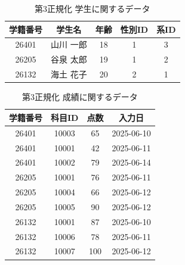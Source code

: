 \documentclass[a4paper,11pt]{ltjsarticle}
\begin{document}
\begin{table}[htbp] %
  \centering
  \caption{第3正規化 学生に関するデータ}
  \label{tab:normalized3_student}
  \begin{tabular}{|c|c|c|c|c|}
    \hline
    \textbf{学籍番号} & \textbf{学生名} & \textbf{年齢} & \textbf{性別ID} & \textbf{系ID} \\
    \hline

    26401         & 山川 一郎        & 18          & 1             & 3            \\
    \hline

    26205         & 谷泉 太郎        & 19          & 1             & 2            \\
    \hline

    26132         & 海土 花子        & 20          & 2             & 1            \\
    \hline
  \end{tabular}
\end{table}
\begin{table}[htbp] %
  \centering
  \caption{第3正規化 成績に関するデータ}
  \label{tab:normalized3_subject}
  \begin{tabular}{|c|c|c|c|}
    \hline
    \textbf{学籍番号} & \textbf{科目ID} & \textbf{点数} & \textbf{入力日} \\
    \hline

    26401         & 10003         & 65          & 2025-06-10   \\
    26401         & 10001         & 42          & 2025-06-11   \\
    26401         & 10002         & 79          & 2025-06-14   \\
    \hline

    26205         & 10001         & 76          & 2025-06-11   \\
    26205         & 10004         & 66          & 2025-06-12   \\
    26205         & 10005         & 90          & 2025-06-12   \\
    \hline

    26132         & 10001         & 87          & 2025-06-10   \\
    26132         & 10006         & 78          & 2025-06-11   \\
    26132         & 10007         & 100         & 2025-06-12   \\
    \hline
  \end{tabular}
\end{table}
\end{document}
